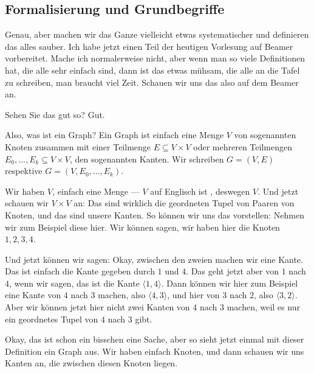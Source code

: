 \subsection{Formalisierung und Grundbegriffe}

\begin{spoken-clean}[00:13:00 - 00:14:08]
Genau, aber machen wir das Ganze vielleicht etwas systematischer und definieren das alles sauber. Ich habe jetzt einen Teil der heutigen Vorlesung auf Beamer vorbereitet. Mache ich normalerweise nicht, aber wenn man so viele Definitionen hat, die alle sehr einfach sind, dann ist das etwas mühsam, die alle an die Tafel zu schreiben, man braucht viel Zeit. Schauen wir uns das also auf dem Beamer an. 

Sehen Sie das gut so? Gut.

Also, was ist ein Graph? Ein Graph ist einfach eine Menge $V$ von sogenannten Knoten zusammen mit einer Teilmenge $E \subseteq V \times V$ oder mehreren Teilmengen $E_0, \dots, E_k \subseteq V \times V$, den sogenannten Kanten. Wir schreiben $G = (V, E)$ respektive $G = (V, E_0, \dots, E_k)$.
\end{spoken-clean}

\begin{math-stroke}
\end{math-stroke}

\begin{spoken-clean}[00:14:08 - 00:16:00]
Wir haben $V$, einfach eine Menge --- $V$ auf Englisch ist , deswegen $V$. Und jetzt schauen wir $V \times V$ an: Das sind wirklich die geordneten Tupel von Paaren von Knoten, und das sind unsere Kanten. So können wir uns das vorstellen: Nehmen wir zum Beispiel diese hier. Wir können sagen, wir haben hier die Knoten $1, 2, 3, 4$.

Und jetzt können wir sagen: Okay, zwischen den zweien machen wir eine Kante. Das ist einfach die Kante gegeben durch $1$ und $4$. Das geht jetzt aber von $1$ nach $4$, wenn wir sagen, das ist die Kante $\langle 1, 4 \rangle$. Dann können wir hier zum Beispiel eine Kante von $4$ nach $3$ machen, also $\langle 4, 3 \rangle$, und hier von $3$ nach $2$, also $\langle 3, 2 \rangle$. Aber wir können jetzt hier nicht zwei Kanten von $4$ nach $3$ machen, weil es nur ein geordnetes Tupel von $4$ nach $3$ gibt.

Okay, das ist schon ein bisschen eine Sache, aber so sieht jetzt einmal mit dieser Definition ein Graph aus. Wir haben einfach Knoten, und dann schauen wir uns Kanten an, die zwischen diesen Knoten liegen.
\end{spoken-clean}

